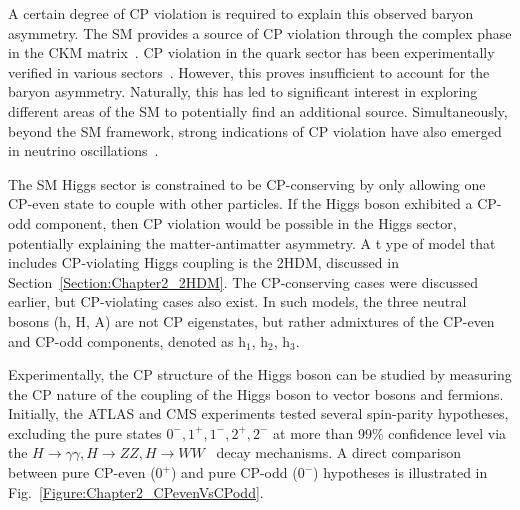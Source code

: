 A certain degree of CP violation is required to explain this observed baryon asymmetry. The SM provides a source of CP violation through the complex phase in the CKM matrix~\cite{CKM_1,CKM_2}. CP violation in the quark sector has been experimentally verified in various sectors~\cite{CP_QuarkSector_1, CP_QuarkSector_2, CP_QuarkSector_3, CP_QuarkSector_4, 
CP_QuarkSector_5, CP_QuarkSector_6, CP_QuarkSector_7, CP_QuarkSector_8, 
CP_QuarkSector_9, CP_QuarkSector_10, CP_QuarkSector_11, CP_QuarkSector_12, 
CP_QuarkSector_13, CP_QuarkSector_14}. However, this proves insufficient to account for the baryon asymmetry. 
Naturally, this has led to significant interest in exploring different areas of the SM to potentially find an additional source. Simultaneously, beyond the SM framework, strong indications of CP violation have also emerged in neutrino oscillations~\cite{Neutrino_Oscillations,CP_Neutrino_Oscillations}. 

The SM Higgs sector is constrained to be CP-conserving by only allowing one CP-even state to couple with other particles. If the Higgs boson exhibited a CP-odd component, then CP violation would be possible in the Higgs sector, potentially explaining the matter-antimatter asymmetry. A t ype of model that includes CP-violating Higgs coupling is the 2HDM, discussed in Section~\ref{Section:Chapter2_2HDM}. The CP-conserving cases were discussed earlier, but CP-violating cases also exist. In such models, the three neutral bosons (h, H, A) are not CP eigenstates, but rather admixtures of the CP-even and CP-odd components, denoted as h$_1$, h$_2$, h$_3$.

Experimentally, the CP structure of the Higgs boson can be studied by measuring the CP nature of the coupling of the Higgs boson to vector bosons and fermions. Initially, the ATLAS and CMS experiments tested several spin-parity hypotheses, excluding the pure states $0^-,1^+,1^-,2^+,2^-$ at more than 99\% confidence level via the $H\to \gamma\gamma, H\to ZZ, H\to WW$~\cite{CP_constraints_1,CP_constraints_2,CP_constraints_3} decay mechanisms. A direct comparison between pure CP-even ($0^+$) and pure CP-odd ($0^-$) hypotheses is illustrated in Fig.~\ref{Figure:Chapter2_CPevenVsCPodd}. 

